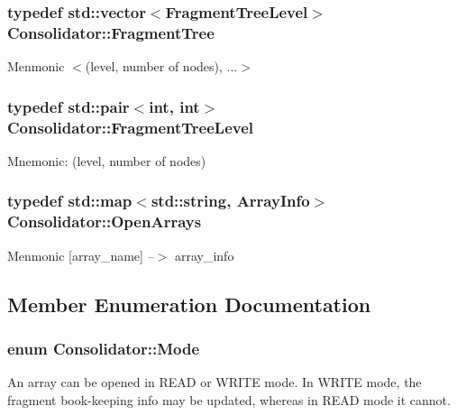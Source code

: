 \subsubsection[{Fragment\+Tree}]{\setlength{\rightskip}{0pt plus 5cm}typedef std\+::vector$<${\bf Fragment\+Tree\+Level}$>$ {\bf Consolidator\+::\+Fragment\+Tree}}\label{classConsolidator_a34bc002a0189718ae47bb2e934a8300f}
Menmonic $<$(level, number of nodes), ...$>$ \hypertarget{classConsolidator_a288ab0c18a45005d380dd70cca50227f}{}
\subsubsection[{Fragment\+Tree\+Level}]{\setlength{\rightskip}{0pt plus 5cm}typedef std\+::pair$<$int, int$>$ {\bf Consolidator\+::\+Fragment\+Tree\+Level}}\label{classConsolidator_a288ab0c18a45005d380dd70cca50227f}
Mnemonic\+: (level, number of nodes) \hypertarget{classConsolidator_ab77c160cb92e14ce01e353c4b200bb74}{}
\subsubsection[{Open\+Arrays}]{\setlength{\rightskip}{0pt plus 5cm}typedef std\+::map$<$std\+::string, {\bf Array\+Info}$>$ {\bf Consolidator\+::\+Open\+Arrays}}\label{classConsolidator_ab77c160cb92e14ce01e353c4b200bb74}
Menmonic \mbox{[}array\+\_\+name\mbox{]} --$>$ array\+\_\+info 

\subsection{Member Enumeration Documentation}
\hypertarget{classConsolidator_abb45365555fb0f3aeca0f933027ca54d}{}
\subsubsection[{Mode}]{\setlength{\rightskip}{0pt plus 5cm}enum {\bf Consolidator\+::\+Mode}}\label{classConsolidator_abb45365555fb0f3aeca0f933027ca54d}
An array can be opened in R\+E\+A\+D or W\+R\+I\+T\+E mode. In W\+R\+I\+T\+E mode, the fragment book-\/keeping info may be updated, whereas in R\+E\+A\+D mode it cannot. 


